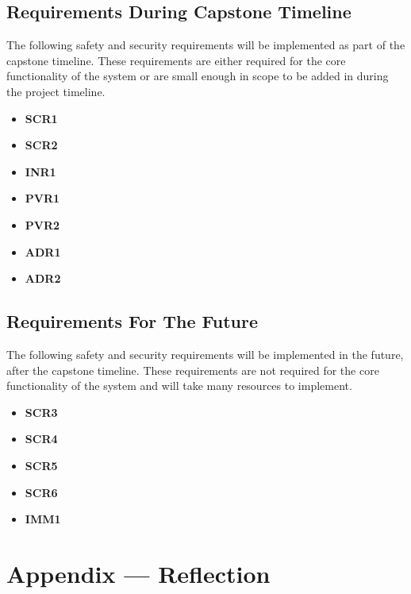 \documentclass{article}
\begin{document}
\subsection{Requirements During Capstone Timeline}
The following safety and security requirements will be implemented as part of the capstone timeline. These requirements are either required for the core functionality of the system or are small enough in scope to be added in during the project timeline.
\begin{itemize}
    \item \textbf{SCR1}
    \item \textbf{SCR2}
    \item \textbf{INR1}
    \item \textbf{PVR1}
    \item \textbf{PVR2}
    \item \textbf{ADR1}
    \item \textbf{ADR2}
\end{itemize}
\subsection{Requirements For The Future}
The following safety and security requirements will be implemented in the future, after the capstone timeline. These requirements are not required for the core functionality of the system and will take many resources to implement.
\begin{itemize}
    \item \textbf{SCR3}
    \item \textbf{SCR4}
    \item \textbf{SCR5}
    \item \textbf{SCR6}
    \item \textbf{IMM1}
\end{itemize}

\newpage{}

\section*{Appendix --- Reflection}


\end{document}
